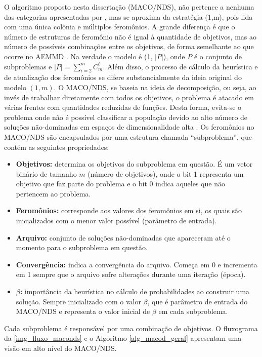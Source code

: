 O algoritmo proposto nesta dissertação (MACO/NDS), não pertence a nenhuma das categorias apresentadas por \cite{Alaya2007}, mas se aproxima da estratégia (1,m), pois lida com uma única colônia e múltiplos feromônios. A grande diferença é que o número de estruturas de feromônio não é igual à quantidade de objetivos, mas ao número de possíveis combinações entre os objetivos, de forma semelhante ao que ocorre no AEMMD \cite{Lafeta2017}. Na verdade o modelo é (1, $|P|$), onde $P$ é o conjunto de subproblemas e $|P| = \sum_{i = 2}^m C_m^i$. Além disso, o processo de cálculo da heurística e de atualização dos feromônios se difere substancialmente da ideia original do modelo $(1,m)$. O MACO/NDS, se baseia na ideia de decomposição, ou seja, ao invés de trabalhar diretamente com todos os objetivos, o problema é atacado em várias frentes com quantidades reduzidas de funções. Desta forma, evita-se o problema onde não é possível classificar a população devido ao alto número de soluções não-dominadas em espaços de dimensionalidade alta \cite{Deb2014}. Os feromônios no MACO/NDS são encapsulados por uma estrutura chamada ``subproblema'', que contém as seguintes propriedades: 

\begin{itemize}
	\item \textbf{Objetivos:} determina os objetivos do subproblema em questão. É um vetor binário de tamanho $m$ (número de objetivos), onde o bit 1 representa um objetivo que faz parte do problema e o bit 0 indica aqueles que não pertencem ao problema.
	\item \textbf{Feromônios:} corresponde aos valores dos feromônios em si, os quais são inicializados com o menor valor possível (parâmetro de entrada).
	\item \textbf{Arquivo:} conjunto de soluções não-dominadas que apareceram até o momento para o subproblema em questão.
	\item \textbf{Convergência:} indica a convergência do arquivo. Começa em 0 e incrementa em 1 sempre que o arquivo sofre alterações durante uma iteração (época).
	\item \textbf{$\beta$:} importância da heurística no cálculo de probabilidades ao construir uma solução. Sempre inicializado com o valor $\beta$, que é parâmetro de entrada do MACO/NDS e representa o valor inicial de $\beta$ em cada subproblema.
\end{itemize}

Cada subproblema é responsável por uma combinação de objetivos. O fluxograma da \autoref{img_fluxo_maconds} e o Algoritmo \ref{alg_macod_geral} apresentam uma visão em alto nível do MACO/NDS.

